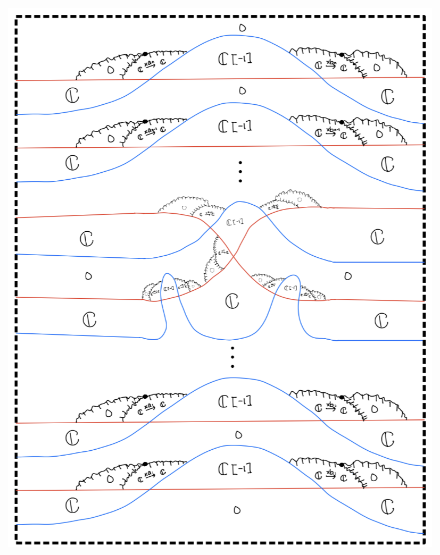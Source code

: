 \begin{figure}[H]
    \centering
    \includegraphics[scale = 0.95]{diagrams/cobord_gen/1.png}
    \caption{}
    \label{fig:your-label}
\end{figure}

